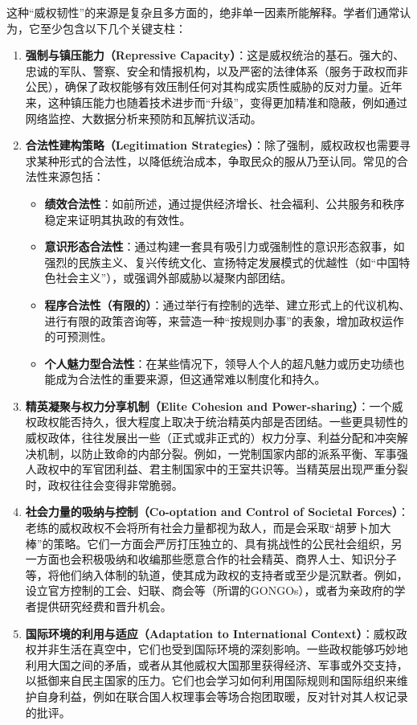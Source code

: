 \documentclass[UTF8, 10pt]{ctexbook}
\begin{document}
这种“威权韧性”的来源是复杂且多方面的，绝非单一因素所能解释。学者们通常认为，它至少包含以下几个关键支柱：
\begin{enumerate}
    \item  \textbf{强制与镇压能力（Repressive Capacity）}：这是威权统治的基石。强大的、忠诚的军队、警察、安全和情报机构，以及严密的法律体系（服务于政权而非公民），确保了政权能够有效压制任何对其构成实质性威胁的反对力量。近年来，这种镇压能力也随着技术进步而“升级”，变得更加精准和隐蔽，例如通过网络监控、大数据分析来预防和瓦解抗议活动。
    \item  \textbf{合法性建构策略（Legitimation Strategies）}：除了强制，威权政权也需要寻求某种形式的合法性，以降低统治成本，争取民众的服从乃至认同。常见的合法性来源包括：
        \begin{itemize}
            \item \textbf{绩效合法性}：如前所述，通过提供经济增长、社会福利、公共服务和秩序稳定来证明其执政的有效性。
            \item \textbf{意识形态合法性}：通过构建一套具有吸引力或强制性的意识形态叙事，如强烈的民族主义、复兴传统文化、宣扬特定发展模式的优越性（如“中国特色社会主义”），或强调外部威胁以凝聚内部团结。
            \item \textbf{程序合法性（有限的）}：通过举行有控制的选举、建立形式上的代议机构、进行有限的政策咨询等，来营造一种“按规则办事”的表象，增加政权运作的可预测性。
            \item \textbf{个人魅力型合法性}：在某些情况下，领导人个人的超凡魅力或历史功绩也能成为合法性的重要来源，但这通常难以制度化和持久。
        \end{itemize}
    \item  \textbf{精英凝聚与权力分享机制（Elite Cohesion and Power-sharing）}：一个威权政权能否持久，很大程度上取决于统治精英内部是否团结。一些更具韧性的威权政体，往往发展出一些（正式或非正式的）权力分享、利益分配和冲突解决机制，以防止致命的内部分裂。例如，一党制国家内部的派系平衡、军事强人政权中的军官团利益、君主制国家中的王室共识等。当精英层出现严重分裂时，政权往往会变得非常脆弱。
    \item  \textbf{社会力量的吸纳与控制（Co-optation and Control of Societal Forces）}：老练的威权政权不会将所有社会力量都视为敌人，而是会采取“胡萝卜加大棒”的策略。它们一方面会严厉打压独立的、具有挑战性的公民社会组织，另一方面也会积极吸纳和收编那些愿意合作的社会精英、商界人士、知识分子等，将他们纳入体制的轨道，使其成为政权的支持者或至少是沉默者。例如，设立官方控制的工会、妇联、商会等（所谓的GONGOs），或者为亲政府的学者提供研究经费和晋升机会。
    \item  \textbf{国际环境的利用与适应（Adaptation to International Context）}：威权政权并非生活在真空中，它们也受到国际环境的深刻影响。一些政权能够巧妙地利用大国之间的矛盾，或者从其他威权大国那里获得经济、军事或外交支持，以抵御来自民主国家的压力。它们也会学习如何利用国际规则和国际组织来维护自身利益，例如在联合国人权理事会等场合抱团取暖，反对针对其人权记录的批评。
\end{enumerate}
\end{document}
